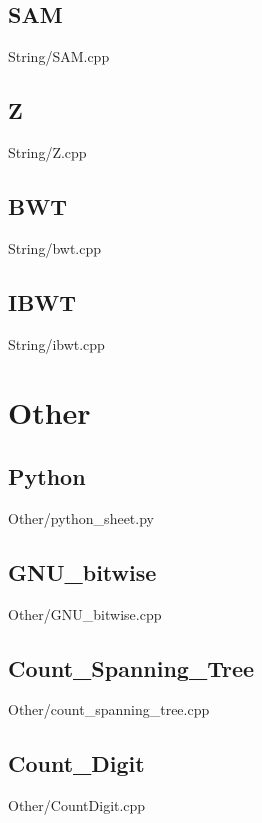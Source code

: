     \subsection{SAM}
         {String/SAM.cpp}
    \subsection{Z}
         {String/Z.cpp}
    \subsection{BWT}
         {String/bwt.cpp}
    \subsection{IBWT}
         {String/ibwt.cpp}

\section{Other}
    \subsection{Python}
         {Other/python_sheet.py}
    \subsection{GNU\_bitwise}
         {Other/GNU_bitwise.cpp}
    \subsection{Count\_Spanning\_Tree}
         {Other/count_spanning_tree.cpp}
    \subsection{Count\_Digit}
         {Other/CountDigit.cpp}

\onecolumn
\centering
{}
